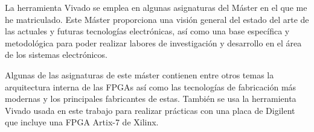 La herramienta Vivado se emplea en algunas asignaturas del Máster en el que me he matriculado. Este Máster proporciona una visión general del estado del arte de las 
actuales y futuras tecnologías electrónicas, así como una base específica y metodológica para poder realizar labores de investigación y desarrollo en el área de los 
sistemas electrónicos.

Algunas de las asignaturas de este máster contienen entre otros temas la arquitectura interna de las FPGAs así como las tecnologías de fabricación más modernas y los 
principales fabricantes de estas. También se usa la herramienta Vivado usada en este trabajo para realizar prácticas con una placa de Digilent que incluye una 
FPGA Artix-7 de Xilinx. 